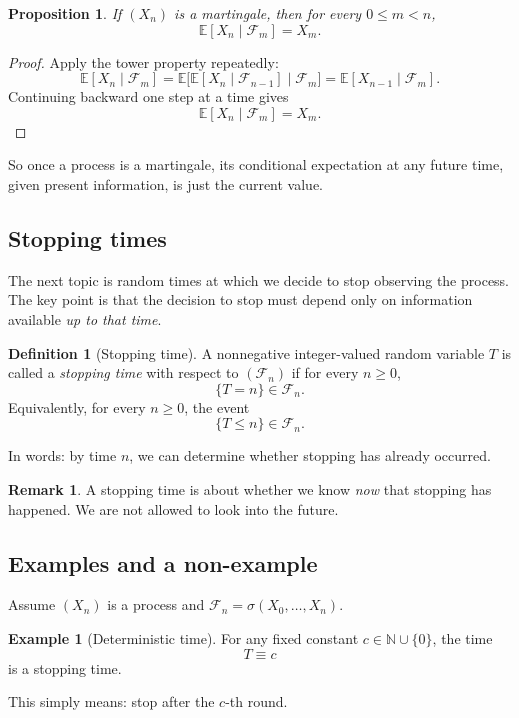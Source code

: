 \documentclass[11pt]{article}
\newtheorem{proposition}[theorem]{Proposition}
\theoremstyle{definition}
\newtheorem{definition}[theorem]{Definition}
\newtheorem{example}[theorem]{Example}
\newtheorem{remark}[theorem]{Remark}
\begin{document}
\begin{proposition}
If \((X_n)\) is a martingale, then for every \(0\le m<n\),
\[
\mathbb E[X_n\mid \mathcal F_m]=X_m.
\]
\end{proposition}

\begin{proof}
Apply the tower property repeatedly:
\[
\mathbb E[X_n\mid \mathcal F_m]
=
\mathbb E\bigl[\mathbb E[X_n\mid \mathcal F_{n-1}]\mid \mathcal F_m\bigr]
=
\mathbb E[X_{n-1}\mid \mathcal F_m].
\]
Continuing backward one step at a time gives
\[
\mathbb E[X_n\mid \mathcal F_m]=X_m.
\]
\end{proof}

So once a process is a martingale, its conditional expectation at any future time, given present information, is just the current value.

\subsection{Stopping times}

The next topic is random times at which we decide to stop observing the process.
The key point is that the decision to stop must depend only on information available \emph{up to that time}.

\begin{definition}[Stopping time]
A nonnegative integer-valued random variable \(T\) is called a \emph{stopping time} with respect to \((\mathcal F_n)\) if for every \(n\ge 0\),
\[
\{T=n\}\in \mathcal F_n.
\]
Equivalently, for every \(n\ge 0\), the event
\[
\{T\le n\}\in \mathcal F_n.
\]
\end{definition}

In words: by time \(n\), we can determine whether stopping has already occurred.

\begin{remark}
A stopping time is about whether we know \emph{now} that stopping has happened. We are not allowed to look into the future.
\end{remark}

\subsection{Examples and a non-example}

Assume \((X_n)\) is a process and \(\mathcal F_n=\sigma(X_0,\dots,X_n)\).

\begin{example}[Deterministic time]
For any fixed constant \(c\in \mathbb N\cup\{0\}\), the time
\[
T\equiv c
\]
is a stopping time.

This simply means: stop after the \(c\)-th round.
\end{example}
\end{document}
